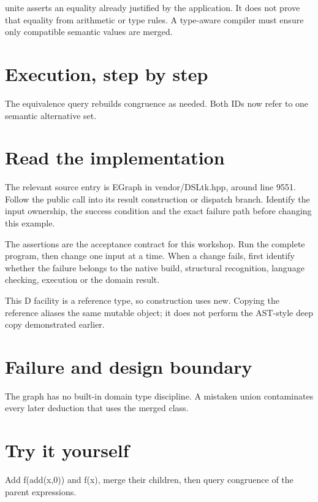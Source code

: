 \clearpage
{}
unite asserts an equality already justified by the application. It does not prove that equality from arithmetic or type rules. A type-aware compiler must ensure only compatible semantic values are merged.


\section*{Execution, step by step}
The equivalence query rebuilds congruence as needed. Both IDs now refer to one semantic alternative set.

\section*{Read the implementation}
The relevant source entry is EGraph in vendor/DSLtk.hpp, around line 9551. Follow the public call into its result construction or dispatch branch. Identify the input ownership, the success condition and the exact failure path before changing this example.

The assertions are the acceptance contract for this workshop. Run the complete program, then change one input at a time. When a change fails, first identify whether the failure belongs to the native build, structural recognition, language checking, execution or the domain result.

\clearpage
{}
This D facility is a reference type, so construction uses new. Copying the reference aliases the same mutable object; it does not perform the AST-style deep copy demonstrated earlier.


\section*{Failure and design boundary}
The graph has no built-in domain type discipline. A mistaken union contaminates every later deduction that uses the merged class.

\section*{Try it yourself}
Add f(add(x,0)) and f(x), merge their children, then query congruence of the parent expressions.

